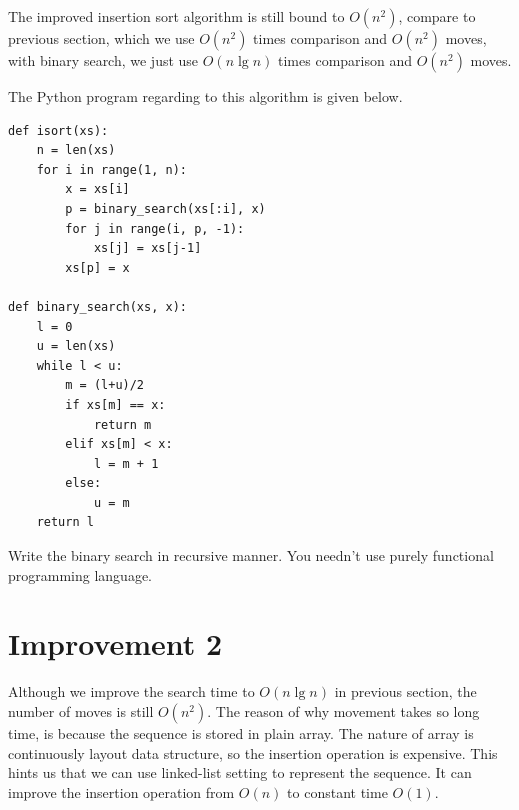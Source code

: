 \documentclass{article}
\begin{document}
\begin{algorithmic}
  \State $l \gets 1$
  \State $u \gets 1+|A|$}
  \While{$l < u$}
    \State $m \gets \lfloor \frac{l+u}{2} \rfloor$
    \If{$A[m] = x$}
      \State \Return $m$ \Comment{Find a duplicated element}
    \ElsIf{$A[m] < x$}
      \State $l \gets m+1$
    \Else
      \State $u \gets m$
    \EndIf
  \EndWhile
  \State \Return $l$
\EndFunction
\end{algorithmic}

The improved insertion sort algorithm is still bound to $O(n^2)$,
compare to previous section, which we use $O(n^2)$ times comparison and
$O(n^2)$ moves, with binary search, we just use $O(n \lg n)$ times
comparison and $O(n^2)$ moves.

The Python program regarding to this algorithm is given below.

\lstset{language=Python}
\begin{lstlisting}
def isort(xs):
    n = len(xs)
    for i in range(1, n):
        x = xs[i]
        p = binary_search(xs[:i], x)
        for j in range(i, p, -1):
            xs[j] = xs[j-1]
        xs[p] = x

def binary_search(xs, x):
    l = 0
    u = len(xs)
    while l < u:
        m = (l+u)/2
        if xs[m] == x:
            return m
        elif xs[m] < x:
            l = m + 1
        else:
            u = m
    return l
\end{lstlisting}

\begin{Exercise}
Write the binary search in recursive manner. You needn't use purely functional
programming language.
\end{Exercise}


\section{Improvement 2}

Although we improve the search time to $O(n \lg n)$ in previous section, the
number of moves is still $O(n^2)$. The reason of why movement takes so long
time, is because the sequence is stored in plain array. The nature of array
is continuously layout data structure, so the insertion operation is expensive.
This hints us that we can use linked-list setting to represent the sequence.
It can improve the insertion operation from $O(n)$ to constant time $O(1)$.
\end{document}

